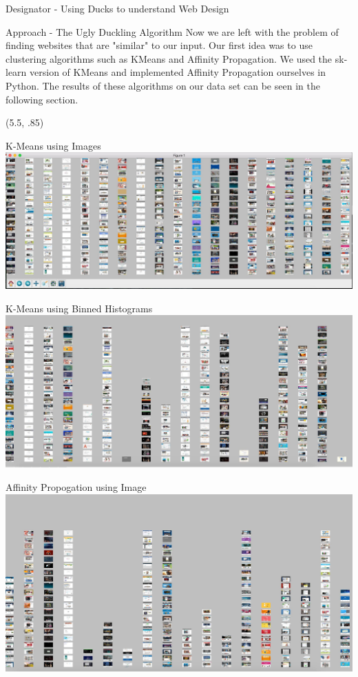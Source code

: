 \documentclass{beamer}
\begin{document}
\begin{frame}{\centerline{\Huge Designator - Using Ducks to understand Web Design}}
\begin{textblock}{5}
\begin{block}{Approach - The Ugly Duckling Algorithm}
Now we are left with the problem of finding websites that are "similar" to our input. Our first idea was to use
clustering algorithms such as KMeans and Affinity Propagation. We used the sk-learn version of KMeans and implemented
Affinity Propagation ourselves in Python. The results of these algorithms on our data set can be seen in the following
section.
\end{block}


\end{textblock}

\begin{textblock}{5}(5.5, .85)

\begin{block}{K-Means using Images}
\includegraphics[scale=.5]{imgkmeans.png}
\end{block}
\begin{block}{ K-Means using Binned Histograms}
\includegraphics[scale=.5]{binKmeans.jpg}
\end{block}
\begin{block}{Affinity Propogation using Image}
\includegraphics[scale=.5]{affPropImg.jpg}

\end{block}
\end{textblock}
\end{frame}
\end{document}
